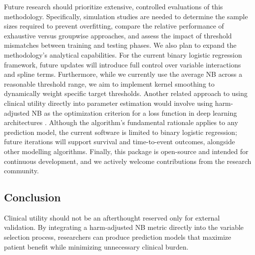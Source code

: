 Future research should prioritize extensive, controlled evaluations of this methodology. Specifically, simulation studies are needed to determine the sample sizes required to prevent overfitting, compare the relative performance of exhaustive versus groupwise approaches, and assess the impact of threshold mismatches between training and testing phases. We also plan to expand the methodology's analytical capabilities. For the current binary logistic regression framework, future updates will introduce full control over variable interactions and spline terms. Furthermore, while we currently use the average \gls{NB} across a reasonable threshold range, we aim to implement kernel smoothing to dynamically weight specific target thresholds. Another related approach to using clinical utility directly into parameter estimation would involve using harm-adjusted \gls{NB} as the optimization criterion for a loss function in deep learning architectures \cite{vickersHypothesisNetBenefit2025}. Although the algorithm's fundamental rationale applies to any prediction model, the current software is limited to binary logistic regression; future iterations will support survival and time-to-event outcomes, alongside other modelling algorithms. Finally, this package is open-source and intended for continuous development, and we actively welcome contributions from the research community.

\subsection{Conclusion}

Clinical utility should not be an afterthought reserved only for external validation. By integrating a harm-adjusted \gls{NB} metric directly into the variable selection process, researchers can produce prediction models that maximize patient benefit while minimizing unnecessary clinical burden.

